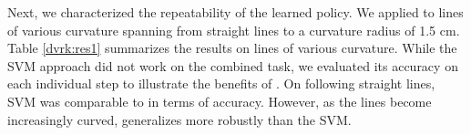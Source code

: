 Next, we characterized the repeatability of the learned policy.
We applied \hirl to lines of various curvature spanning from straight lines to a curvature radius of 1.5 cm.
Table \ref{dvrk:res1} summarizes the results on lines of various curvature.
While the SVM approach did not work on the combined task, we evaluated its accuracy on each individual step to illustrate the benefits of \hirl.
On following straight lines, SVM was comparable to \hirl in terms of accuracy.
However, as the lines become increasingly curved, \hirl generalizes more robustly than the SVM.


